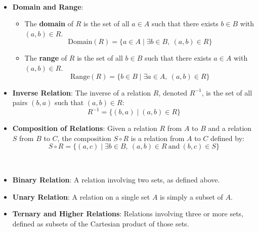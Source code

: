 \vspace{12pt}
\begin{note}
\ \begin{itemize}
	\item \textbf{Domain and Range}:
	\begin{itemize}
		\item The \textbf{domain} of \( R \) is the set of all \( a \in A \) such that there exists \( b \in B \) with \((a, b) \in R\).
		\[
		\text{Domain}(R) = \{ a \in A \mid \exists b \in B, \ (a, b) \in R \}
		\]
		\item The \textbf{range} of \( R \) is the set of all \( b \in B \) such that there exists \( a \in A \) with \((a, b) \in R\).
		\[
		\text{Range}(R) = \{ b \in B \mid \exists a \in A, \ (a, b) \in R \}
		\]
	\end{itemize}
	
	\item \textbf{Inverse Relation}: The inverse of a relation \( R \), denoted \( R^{-1} \), is the set of all pairs \((b, a)\) such that \((a, b) \in R\):
	\[
	R^{-1} = \{ (b, a) \mid (a, b) \in R \}
	\]
	
	\item \textbf{Composition of Relations}: Given a relation \( R \) from \( A \) to \( B \) and a relation \( S \) from \( B \) to \( C \), the composition \( S \circ R \) is a relation from \( A \) to \( C \) defined by:
	\[
	S \circ R = \{ (a, c) \mid \exists b \in B, \ (a, b) \in R \ \text{and} \ (b, c) \in S \}
	\]
\end{itemize}
\end{note}

\vspace{12pt}
\begin{note}
\ \begin{itemize}
	\item \textbf{Binary Relation}: A relation involving two sets, as defined above.
	\item \textbf{Unary Relation}: A relation on a single set \( A \) is simply a subset of \( A \).
	\item \textbf{Ternary and Higher Relations}: Relations involving three or more sets, defined as subsets of the Cartesian product of those sets.
\end{itemize}
\end{note}

